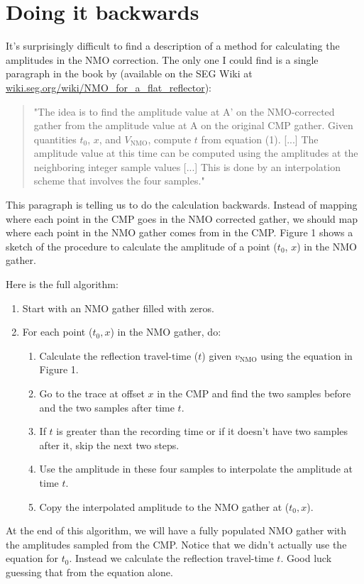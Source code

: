 \section{Doing it backwards}

It's surprisingly difficult to find a description of a method for calculating
the amplitudes in the NMO correction.
The only one I could find is a single paragraph in the book by
\citet{Yilmaz_2001} (available on the SEG Wiki at
\href{http://wiki.seg.org/wiki/NMO_for_a_flat_reflector}{wiki.seg.org/wiki/NMO\_for\_a\_flat\_reflector}):

\begin{quotation}
"The idea is to find the amplitude value at A' on the NMO-corrected gather from the amplitude value at A on the original CMP gather. Given quantities $t_0$, $x$, and $V_\mathrm{NMO}$, compute $t$ from equation (1). [...] The amplitude value at this time can be computed using the amplitudes at the neighboring integer sample values [...] This is done by an interpolation scheme that involves the four samples."
\end{quotation}

This paragraph is telling us to do the calculation backwards.
Instead of mapping where each point in the CMP goes in the NMO corrected
gather, we should map where each point in the NMO gather comes from in the CMP.
Figure 1 shows a sketch of the procedure to calculate the amplitude of a point
($t_0$, $x$) in the NMO gather.

Here is the full algorithm:

\begin{enumerate}
    \item Start with an NMO gather filled with zeros.
    \item For each point ($t_0, x$) in the NMO gather, do:
    \begin{enumerate}
        \item Calculate the reflection travel-time ($t$) given $v_\mathrm{NMO}$ using
              the equation in Figure 1.
        \item Go to the trace at offset $x$ in the CMP and find the two samples
              before and the two samples after time $t$.
        \item If $t$ is greater than the recording time or if it doesn't have
              two samples after it, skip the next two steps.
        \item Use the amplitude in these four samples to interpolate the
              amplitude at time $t$.
        \item Copy the interpolated amplitude to the NMO gather at ($t_0, x$).
    \end{enumerate}
\end{enumerate}

At the end of this algorithm, we will have a fully populated NMO gather with
the amplitudes sampled from the CMP.
Notice that we didn't actually use the equation for $t_0$.
Instead we calculate the reflection travel-time $t$.
Good luck guessing that from the equation alone.
